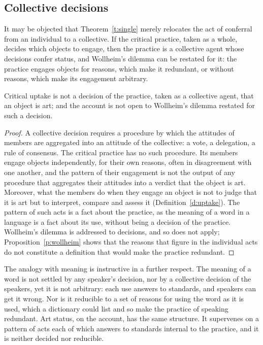 \documentclass{situationist-preprint}
\begin{document}
\subsection{Collective decisions}

It may be objected that Theorem~\ref{t:single} merely relocates the act of conferral from an individual to a collective. If the critical practice, taken as a whole, decides which objects to engage, then the practice is a collective agent whose decisions confer status, and Wollheim's dilemma can be restated for it: the practice engages objects for reasons, which make it redundant, or without reasons, which make its engagement arbitrary.

\begin{proposition}\label{p:collective}
Critical uptake is not a decision of the practice, taken as a collective agent, that an object is art; and the account is not open to Wollheim's dilemma restated for such a decision.
\end{proposition}

\begin{proof}
A collective decision requires a procedure by which the attitudes of members are aggregated into an attitude of the collective: a vote, a delegation, a rule of consensus. The critical practice has no such procedure. Its members engage objects independently, for their own reasons, often in disagreement with one another, and the pattern of their engagement is not the output of any procedure that aggregates their attitudes into a verdict that the object is art. Moreover, what the members do when they engage an object is not to judge that it is art but to interpret, compare and assess it (Definition~\ref{d:uptake}). The pattern of such acts is a fact about the practice, as the meaning of a word in a language is a fact about its use, without being a decision of the practice. Wollheim's dilemma is addressed to decisions, and so does not apply; Proposition~\ref{p:wollheim} shows that the reasons that figure in the individual acts do not constitute a definition that would make the practice redundant.
\end{proof}

The analogy with meaning is instructive in a further respect. The meaning of a word is not settled by any speaker's decision, nor by a collective decision of the speakers, yet it is not arbitrary: each use answers to standards, and speakers can get it wrong. Nor is it reducible to a set of reasons for using the word as it is used, which a dictionary could list and so make the practice of speaking redundant. Art status, on the account, has the same structure. It supervenes on a pattern of acts each of which answers to standards internal to the practice, and it is neither decided nor reducible.
\end{document}
